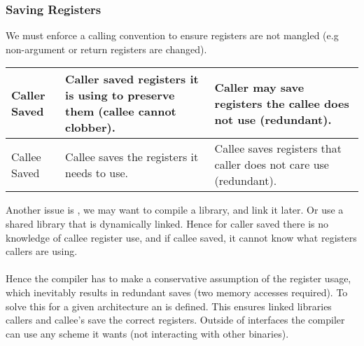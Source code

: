 \documentclass{report}
\begin{document}
            \subsubsection*{Saving Registers}   
                We must enforce a calling convention to ensure registers are not mangled (e.g non-argument or return registers are changed).
                \begin{center}
                    \begin{tabular}{l p{} p{}}
                        Caller Saved & Caller saved registers it is using to preserve them (callee cannot clobber). & Caller may save registers the callee does not use (redundant). \\
                        \hline
                        Callee Saved & Callee saves the registers it needs to use. & Callee saves registers that caller does not care use (redundant). \\
                    \end{tabular}
                \end{center}

                Another issue is , we may want to compile a library, and link it later. Or use a shared library that is dynamically linked. Hence for caller saved there is no knowledge of callee register use, and if callee saved, it cannot know what registers callers are using.
                \\
                \\ Hence the compiler has to make a conservative assumption of the register usage, which inevitably results in redundant saves (two memory accesses required).
                To solve this for a given architecture an  is defined. This ensures linked libraries callers and callee's save the correct registers. Outside of interfaces the compiler can use any scheme it wants (not interacting with other binaries).
\end{document}
